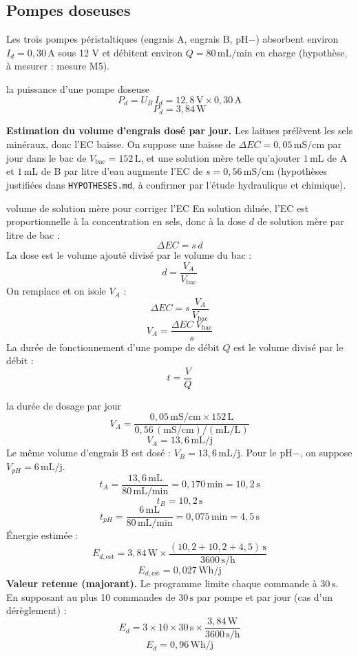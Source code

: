 \documentclass[11pt,a4paper]{article}
\newcommand{\U}[1]{\,\mathrm{#1}}
\begin{document}
\subsection{Pompes doseuses}

Les trois pompes péristaltiques (engrais A, engrais B, pH$-$) absorbent environ $I_d = 0{,}30\U{A}$ sous 12 V et débitent environ $Q = 80\U{mL/min}$ en charge (hypothèse, à mesurer : mesure M5).

\begin{calcul}{la puissance d'une pompe doseuse}
\[
P_d = U_B \, I_d = 12{,}8\U{V} \times 0{,}30\U{A}
\]
\[
P_d = 3{,}84\U{W}
\]
\end{calcul}

\textbf{Estimation du volume d'engrais dosé par jour.} Les laitues prélèvent les sels minéraux, donc l'EC baisse. On suppose une baisse de $\Delta EC = 0{,}05\U{mS/cm}$ par jour dans le bac de $V_{\text{bac}} = 152\U{L}$, et une solution mère telle qu'ajouter $1\U{mL}$ de A et $1\U{mL}$ de B par litre d'eau augmente l'EC de $s = 0{,}56\U{mS/cm}$ (hypothèses justifiées dans \texttt{HYPOTHESES.md}, à confirmer par l'étude hydraulique et chimique).

\begin{demo}{volume de solution mère pour corriger l'EC}
En solution diluée, l'EC est proportionnelle à la concentration en sels, donc à la dose $d$ de solution mère par litre de bac :
\[
\Delta EC = s \, d
\]
La dose est le volume ajouté divisé par le volume du bac :
\[
d = \frac{V_A}{V_{\text{bac}}}
\]
On remplace et on isole $V_A$ :
\[
\Delta EC = s \, \frac{V_A}{V_{\text{bac}}}
\]
\[
V_A = \frac{\Delta EC \; V_{\text{bac}}}{s}
\]
La durée de fonctionnement d'une pompe de débit $Q$ est le volume divisé par le débit :
\[
t = \frac{V}{Q}
\]
\end{demo}

\begin{calcul}{la durée de dosage par jour}
\[
V_A = \frac{0{,}05\U{mS/cm} \times 152\U{L}}{0{,}56\U{(mS/cm)/(mL/L)}}
\]
\[
V_A = 13{,}6\U{mL/j}
\]
Le même volume d'engrais B est dosé : $V_B = 13{,}6\U{mL/j}$. Pour le pH$-$, on suppose $V_{pH} = 6\U{mL/j}$.
\[
t_A = \frac{13{,}6\U{mL}}{80\U{mL/min}} = 0{,}170\U{min} = 10{,}2\U{s}
\]
\[
t_B = 10{,}2\U{s}
\]
\[
t_{pH} = \frac{6\U{mL}}{80\U{mL/min}} = 0{,}075\U{min} = 4{,}5\U{s}
\]
Énergie estimée :
\[
E_{d,\text{est}} = 3{,}84\U{W} \times \frac{(10{,}2 + 10{,}2 + 4{,}5)\U{s}}{3600\U{s/h}}
\]
\[
E_{d,\text{est}} = 0{,}027\U{Wh/j}
\]
\textbf{Valeur retenue (majorant).} Le programme limite chaque commande à $30\U{s}$. En supposant au plus 10 commandes de $30\U{s}$ par pompe et par jour (cas d'un dérèglement) :
\[
E_{d} = 3 \times 10 \times 30\U{s} \times \frac{3{,}84\U{W}}{3600\U{s/h}}
\]
\[
E_{d} = 0{,}96\U{Wh/j}
\]
\end{calcul}
\end{document}
